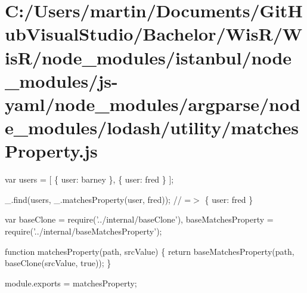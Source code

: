 \hypertarget{_c_1_2_users_2martin_2_documents_2_git_hub_visual_studio_2_bachelor_2_wis_r_2_wis_r_2node_module079d43dbdd9255cd2792cdcc172e57f5}{}\section{C\+:/\+Users/martin/\+Documents/\+Git\+Hub\+Visual\+Studio/\+Bachelor/\+Wis\+R/\+Wis\+R/node\+\_\+modules/istanbul/node\+\_\+modules/js-\/yaml/node\+\_\+modules/argparse/node\+\_\+modules/lodash/utility/matches\+Property.\+js}
var users = \mbox{[} \{ \textquotesingle{}user\textquotesingle{}\+: \textquotesingle{}barney\textquotesingle{} \}, \{ \textquotesingle{}user\textquotesingle{}\+: \textquotesingle{}fred\textquotesingle{} \} \mbox{]};

\+\_\+.\+find(users, \+\_\+.\+matches\+Property(\textquotesingle{}user\textquotesingle{}, \textquotesingle{}fred\textquotesingle{})); // =$>$ \{ \textquotesingle{}user\textquotesingle{}\+: \textquotesingle{}fred\textquotesingle{} \}


\begin{DoxyCodeInclude}
var baseClone = require(\textcolor{stringliteral}{'../internal/baseClone'}),
    baseMatchesProperty = require(\textcolor{stringliteral}{'../internal/baseMatchesProperty'});

\textcolor{keyword}{function} matchesProperty(path, srcValue) \{
  \textcolor{keywordflow}{return} baseMatchesProperty(path, baseClone(srcValue, \textcolor{keyword}{true}));
\}

module.exports = matchesProperty;
\end{DoxyCodeInclude}
 